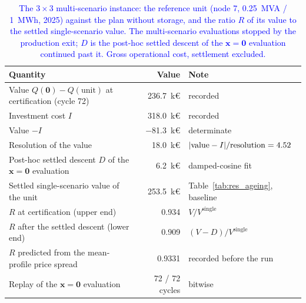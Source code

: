 \begin{table}[htbp!]
    \centering
    \caption{\textcolor{blue}{The $3 \times 3$ multi-scenario instance: the reference unit (node 7, 0.25~MVA / 1~MWh, 2025) against the plan without storage, and the ratio $R$ of its value to the settled single-scenario value. The multi-scenario evaluations stopped by the production exit; $D$ is the post-hoc settled descent of the $\boldsymbol{x} = \boldsymbol{0}$ evaluation continued past it. Gross operational cost, settlement excluded.}}
    \label{tab:res_multiscenario}
    \scriptsize\setlength{\tabcolsep}{4pt}
    \begin{tabular}{l r l}
        \toprule
        Quantity & Value & Note \\
        \midrule
        Value $Q(\boldsymbol{0}) - Q(\text{unit})$ at certification (cycle 72) & 236.7~k\euro & recorded \\
        Investment cost $I$                                                  & 318.0~k\euro & recorded \\
        Value $- I$                                                          & $-$81.3~k\euro & determinate \\
        Resolution of the value                                              & 18.0~k\euro  & $|{\rm value} - I| / {\rm resolution} = 4.52$ \\
        Post-hoc settled descent $D$ of the $\boldsymbol{x} = \boldsymbol{0}$ evaluation & 6.2~k\euro & damped-cosine fit \\
        Settled single-scenario value of the unit                           & 253.5~k\euro & Table~\ref{tab:res_ageing}, baseline \\
        $R$ at certification (upper end)                                     & 0.934 & $V / V^{\text{single}}$ \\
        $R$ after the settled descent (lower end)                            & 0.909 & $(V - D) / V^{\text{single}}$ \\
        $R$ predicted from the mean-profile price spread                     & 0.9331 & recorded before the run \\
        Replay of the $\boldsymbol{x} = \boldsymbol{0}$ evaluation           & 72 / 72 cycles & bitwise \\
        \bottomrule
    \end{tabular}
\end{table}


